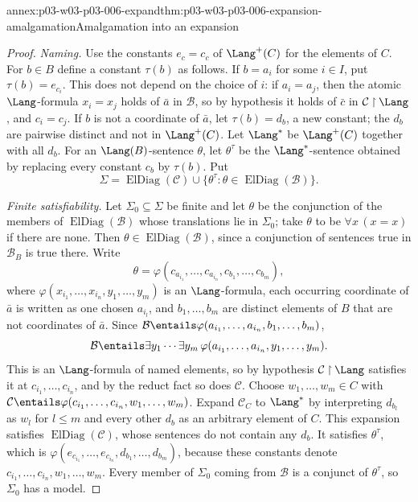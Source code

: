 \begin{annexitem}{annex:p03-w03-p03-006-expand}{thm:p03-w03-p03-006-expansion-amalgamation}{Amalgamation into an expansion}
\begin{proof}
\emph{Naming.}  Use the constants \(e_c=c_c\) of \(\Lang^+(C)\) for the
elements of \(C\).  For \(b\in B\) define a constant \(\tau(b)\) as
follows.  If \(b=a_i\) for some \(i\in I\), put \(\tau(b)=e_{c_i}\).  This
does not depend on the choice of \(i\): if \(a_i=a_j\), then the atomic
\(\Lang\)-formula \(x_i=x_j\) holds of \(\bar a\) in \(\mathcal B\), so by
hypothesis it holds of \(\bar c\) in
\(\mathcal C\mathbin{\upharpoonright}\Lang\), and \(c_i=c_j\).  If \(b\)
is not a coordinate of \(\bar a\), let \(\tau(b)=d_b\), a new constant; the
\(d_b\) are pairwise distinct and not in \(\Lang^+(C)\).  Let
\(\Lang^*\) be \(\Lang^+(C)\) together with all \(d_b\).  For an
\(\Lang(B)\)-sentence \(\theta\), let \(\theta^\tau\) be the
\(\Lang^*\)-sentence obtained by replacing every constant \(c_b\) by
\(\tau(b)\).  Put
\[
 \Sigma=\operatorname{ElDiag}(\mathcal C)
   \cup\{\theta^\tau:\theta\in\operatorname{ElDiag}(\mathcal B)\}.
\]

\emph{Finite satisfiability.}  Let \(\Sigma_0\subseteq\Sigma\) be finite and
let \(\theta\) be the conjunction of the members of
\(\operatorname{ElDiag}(\mathcal B)\) whose translations lie in
\(\Sigma_0\); take \(\theta\) to be \(\forall x\,(x=x)\) if there are none.
Then \(\theta\in\operatorname{ElDiag}(\mathcal B)\), since a conjunction of
sentences true in \(\mathcal B_B\) is true there.  Write
\[
 \theta=\varphi(c_{a_{i_1}},\ldots,c_{a_{i_n}},c_{b_1},\ldots,c_{b_m}),
\]
where \(\varphi(x_{i_1},\ldots,x_{i_n},y_1,\ldots,y_m)\) is an
\(\Lang\)-formula, each occurring coordinate of \(\bar a\) is written as one
chosen \(a_{i_l}\), and \(b_1,\ldots,b_m\) are distinct elements of \(B\)
that are not coordinates of \(\bar a\).  Since
\(\mathcal B\entails\varphi(a_{i_1},\ldots,a_{i_n},b_1,\ldots,b_m)\),
\[
 \mathcal B\entails\exists y_1\cdots\exists y_m\,
   \varphi(a_{i_1},\ldots,a_{i_n},y_1,\ldots,y_m).
\]
This is an \(\Lang\)-formula of named elements, so by hypothesis
\(\mathcal C\mathbin{\upharpoonright}\Lang\) satisfies it at
\(c_{i_1},\ldots,c_{i_n}\), and by the reduct fact so does \(\mathcal C\).
Choose \(w_1,\ldots,w_m\in C\) with
\(\mathcal C\entails\varphi(c_{i_1},\ldots,c_{i_n},w_1,\ldots,w_m)\).
Expand \(\mathcal C_C\) to \(\Lang^*\) by interpreting \(d_{b_l}\) as
\(w_l\) for \(l\le m\) and every other \(d_b\) as an arbitrary element of
\(C\).  This expansion satisfies
\(\operatorname{ElDiag}(\mathcal C)\), whose sentences do not contain any
\(d_b\).  It satisfies \(\theta^\tau\), which is
\(\varphi(e_{c_{i_1}},\ldots,e_{c_{i_n}},d_{b_1},\ldots,d_{b_m})\), because
these constants denote \(c_{i_1},\ldots,c_{i_n},w_1,\ldots,w_m\).  Every
member of \(\Sigma_0\) coming from \(\mathcal B\) is a conjunct of
\(\theta^\tau\), so \(\Sigma_0\) has a model.


\end{proof}
\end{annexitem}
